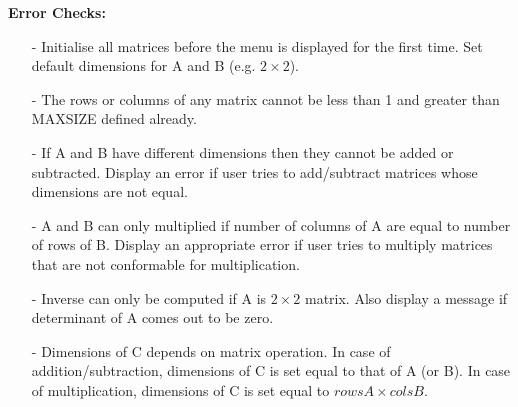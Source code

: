 \documentclass[12pt,a4paper]{article}
\begin{document}
\noindent\textbf{Error Checks:}
\begin{itemize}
\item[-] Initialise all matrices before the menu is displayed for the first time. Set default dimensions for A and B (e.g. $2\times2$).
\item[-] The rows or columns of any matrix cannot be less than 1 and greater than MAXSIZE defined already.
\item[-] If A and B have different dimensions then they cannot be added or subtracted. Display an error if user tries to add/subtract matrices whose dimensions are not equal. 
\item[-] A and B can only multiplied if number of columns of A are equal to number of rows of B. Display an appropriate error if user tries to multiply matrices that are not conformable for multiplication.
\item[-] Inverse can only be computed if A is $2\times2$ matrix. Also display a message if determinant of A comes out to be zero.
\item[-] Dimensions of C depends on matrix operation. In case of addition/subtraction, dimensions of C is set equal to that of A (or B). In case of multiplication, dimensions of C is set equal to $rowsA\times colsB$.
\end{itemize}
\end{document}
